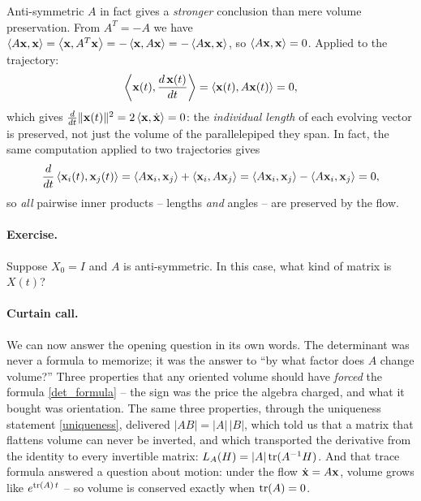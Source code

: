 \documentclass{article}
\begin{document}
Anti-symmetric $A$ in fact gives a {\em stronger\/} conclusion than mere volume
preservation. From $A^T = -A$ we have
$\left< A {\bf x}, {\bf x} \right>
   = \left< {\bf x}, A^T {\bf x} \right>
   = -\left< {\bf x}, A {\bf x} \right>
   = -\left< A {\bf x}, {\bf x} \right>$,
so $\left< A {\bf x}, {\bf x} \right> = 0$. Applied to the trajectory:
\begin{align*}
  \left< {\bf x}(t), \frac{d \, {\bf x}(t)}{dt} \right>
  = \left< {\bf x}(t), A {\bf x}(t)\right> = 0,
\end{align*}
which gives
$\frac{d}{dt} \|{\bf x}(t)\|^2 = 2 \left< {\bf x}, \dot{\bf x} \right> = 0$:
the {\em individual length\/} of each evolving vector is preserved, not just
the volume of the parallelepiped they span. In fact, the same computation
applied to two trajectories gives
\begin{align*}
  \frac{d}{dt} \left< {\bf x}_i(t), {\bf x}_j(t) \right>
  = \left< A {\bf x}_i, {\bf x}_j \right>
    + \left< {\bf x}_i, A {\bf x}_j \right>
  = \left< A {\bf x}_i, {\bf x}_j \right>
    - \left< A {\bf x}_i, {\bf x}_j \right> = 0,
\end{align*}
so {\em all\/} pairwise inner products -- lengths {\em and\/} angles -- are
preserved by the flow.

\paragraph{Exercise.} Suppose $X_0 = I$ and $A$ is anti-symmetric. In this
case, what kind of matrix is $X(t)$?

\paragraph{Curtain call.} We can now answer the opening question in its own
words. The determinant was never a formula to memorize; it was the answer to
``by what factor does $A$ change volume?'' Three properties that any oriented
volume should have {\em forced\/} the formula \eqref{det_formula} -- the sign
was the price the algebra charged, and what it bought was orientation. The
same three properties, through the uniqueness statement \eqref{uniqueness},
delivered $|AB| = |A| \, |B|$, which told us that a matrix that flattens
volume can never be inverted, and which transported the derivative from the
identity to every invertible matrix: $L_A(H) = |A| \, {\rm tr}(A^{-1} H)$.
And that trace formula answered a question about motion: under the flow
$\dot{\bf x} = A {\bf x}$, volume grows like $e^{{\rm tr}(A)\, t}$ -- so
volume is conserved exactly when ${\rm tr}(A) = 0$.
\end{document}
